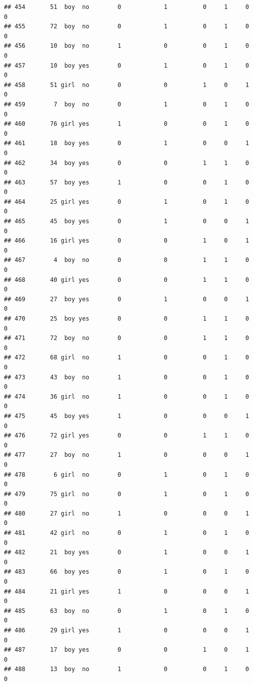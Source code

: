 \documentclass[man]{apa6}
\begin{document}
\begin{verbatim}
## 454       51  boy  no        0            1          0     1     0     0
## 455       72  boy  no        0            1          0     1     0     0
## 456       10  boy  no        1            0          0     1     0     0
## 457       10  boy yes        0            1          0     1     0     0
## 458       51 girl  no        0            0          1     0     1     0
## 459        7  boy  no        0            1          0     1     0     0
## 460       76 girl yes        1            0          0     1     0     0
## 461       18  boy yes        0            1          0     0     1     0
## 462       34  boy yes        0            0          1     1     0     0
## 463       57  boy yes        1            0          0     1     0     0
## 464       25 girl yes        0            1          0     1     0     0
## 465       45  boy yes        0            1          0     0     1     0
## 466       16 girl yes        0            0          1     0     1     0
## 467        4  boy  no        0            0          1     1     0     0
## 468       40 girl yes        0            0          1     1     0     0
## 469       27  boy yes        0            1          0     0     1     0
## 470       25  boy yes        0            0          1     1     0     0
## 471       72  boy  no        0            0          1     1     0     0
## 472       68 girl  no        1            0          0     1     0     0
## 473       43  boy  no        1            0          0     1     0     0
## 474       36 girl  no        1            0          0     1     0     0
## 475       45  boy yes        1            0          0     0     1     0
## 476       72 girl yes        0            0          1     1     0     0
## 477       27  boy  no        1            0          0     0     1     0
## 478        6 girl  no        0            1          0     1     0     0
## 479       75 girl  no        0            1          0     1     0     0
## 480       27 girl  no        1            0          0     0     1     0
## 481       42 girl  no        0            1          0     1     0     0
## 482       21  boy yes        0            1          0     0     1     0
## 483       66  boy yes        0            1          0     1     0     0
## 484       21 girl yes        1            0          0     0     1     0
## 485       63  boy  no        0            1          0     1     0     0
## 486       29 girl yes        1            0          0     0     1     0
## 487       17  boy yes        0            0          1     0     1     0
## 488       13  boy  no        1            0          0     1     0     0

\end{verbatim}
\end{document}
